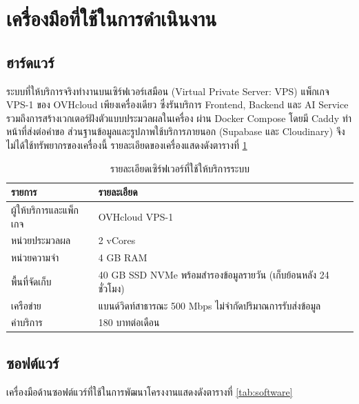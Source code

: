 \section{เครื่องมือที่ใช้ในการดำเนินงาน}


\subsection{ฮาร์ดแวร์}

ระบบที่ให้บริการจริงทำงานบนเซิร์ฟเวอร์เสมือน (Virtual Private Server: VPS) แพ็กเกจ VPS-1 ของ OVHcloud เพียงเครื่องเดียว ซึ่งรันบริการ Frontend, Backend และ AI Service รวมถึงการสร้างเวกเตอร์ฝังตัวแบบประมวลผลในเครื่อง ผ่าน Docker Compose โดยมี Caddy ทำหน้าที่ส่งต่อคำขอ ส่วนฐานข้อมูลและรูปภาพใช้บริการภายนอก (Supabase และ Cloudinary) จึงไม่ได้ใช้ทรัพยากรของเครื่องนี้ รายละเอียดของเครื่องแสดงดังตารางที่ \ref{tab:hardware}

\begin{table}[H]
\centering
\caption{รายละเอียดเซิร์ฟเวอร์ที่ใช้ให้บริการระบบ}
\label{tab:hardware}
\begin{tabular}{|p{4.5cm}|p{8.5cm}|}
\hline
\textbf{รายการ} & \textbf{รายละเอียด} \\
\hline
ผู้ให้บริการและแพ็กเกจ & OVHcloud VPS-1 \\ \hline
หน่วยประมวลผล & 2 vCores \\ \hline
หน่วยความจำ & 4 GB RAM \\ \hline
พื้นที่จัดเก็บ & 40 GB SSD NVMe พร้อมสำรองข้อมูลรายวัน (เก็บย้อนหลัง 24 ชั่วโมง) \\ \hline
เครือข่าย & แบนด์วิดท์สาธารณะ 500 Mbps ไม่จำกัดปริมาณการรับส่งข้อมูล \\ \hline
ค่าบริการ & 180 บาทต่อเดือน \\ \hline
\end{tabular}
\end{table}

\subsection{ซอฟต์แวร์}

เครื่องมือด้านซอฟต์แวร์ที่ใช้ในการพัฒนาโครงงานแสดงดังตารางที่ \ref{tab:software}

